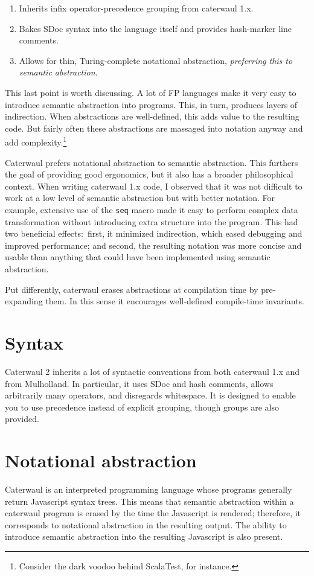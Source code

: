 \documentclass{report}
\begin{document}
\begin{enumerate}
\item{Inherits infix operator-precedence grouping from caterwaul 1.x.}
\item{Bakes SDoc syntax into the language itself and provides hash-marker line comments.}
\item{Allows for thin, Turing-complete notational abstraction, {\em preferring this to semantic abstraction}.}
\end{enumerate}

    This last point is worth discussing. A lot of FP languages make it very easy to introduce semantic abstraction into programs. This, in turn, produces layers of indirection. When
    abstractions are well-defined, this adds value to the resulting code. But fairly often these abstractions are massaged into notation anyway and add complexity.\footnote{Consider the dark
    voodoo behind ScalaTest, for instance.}

    Caterwaul prefers notational abstraction to semantic abstraction. This furthers the goal of providing good ergonomics, but it also has a broader philosophical context. When writing
    caterwaul 1.x code, I observed that it was not difficult to work at a low level of semantic abstraction but with better notation. For example, extensive use of the {\tt seq} macro made it
    easy to perform complex data transformation without introducing extra structure into the program. This had two beneficial effects:~first, it minimized indirection, which eased debugging
    and improved performance; and second, the resulting notation was more concise and usable than anything that could have been implemented using semantic abstraction.

    Put differently, caterwaul erases abstractions at compilation time by pre-expanding them. In this sense it encourages well-defined compile-time invariants.

\chapter{Syntax}
  Caterwaul 2 inherits a lot of syntactic conventions from both caterwaul 1.x and from Mulholland. In particular, it uses SDoc and hash comments, allows arbitrarily many operators, and
  disregards whitespace. It is designed to enable you to use precedence instead of explicit grouping, though groups are also provided.

\chapter{Notational abstraction}
  Caterwaul is an interpreted programming language whose programs generally return Javascript syntax trees. This means that semantic abstraction within a caterwaul program is erased by the
  time the Javascript is rendered; therefore, it corresponds to notational abstraction in the resulting output. The ability to introduce semantic abstraction into the resulting Javascript is
  also present.
\end{document}
